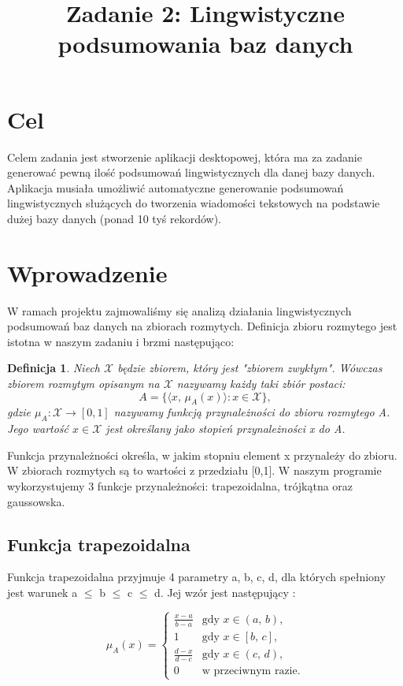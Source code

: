 \documentclass{classrep}
\author{
	\studentinfo{Radosław Grela}{216769} \and
	\studentinfo{Jakub Wąchała}{216914} 
}
\title{Zadanie 2: Lingwistyczne podsumowania baz danych}
\newtheorem{defin}{Definicja}
\begin{document}
	\maketitle
	
	\section{Cel} %
	Celem zadania jest stworzenie aplikacji desktopowej, która ma za zadanie generować pewną ilość podsumowań lingwistycznych dla danej bazy danych. Aplikacja musiała umożliwić automatyczne generowanie podsumowań lingwistycznych służących do tworzenia wiadomości tekstowych na podstawie dużej bazy danych (ponad 10 tyś rekordów). \cite{tresc}
	
	\section{Wprowadzenie} %
	W ramach projektu zajmowaliśmy się analizą działania lingwistycznych podsumowań baz danych na zbiorach rozmytych. Definicja zbioru rozmytego jest istotna w naszym zadaniu i brzmi następująco:
	\begin{defin}
		\label{rozmyty}
		Niech $\mathcal{X}$ będzie zbiorem, który jest "zbiorem zwykłym". Wówczas zbiorem rozmytym opisanym na $\mathcal{X}$ nazywamy każdy taki zbiór postaci:
		\begin{equation}
		A = \{\langle x,\, \mu_A(x)\rangle : x \in \mathcal{X} \}, 
		\end{equation}
		gdzie $\mu_A: \mathcal{X} \to [0,1]$ nazywamy funkcją przynależności do zbioru rozmytego A. Jego wartość $x \in \mathcal{X}$ jest określany jako stopień przynależności x do A.
	\end{defin}

	Funkcja przynależności określa, w jakim stopniu element x przynależy do zbioru. W zbiorach rozmytych są to wartości z przedziału [0,1]. W naszym programie wykorzystujemy 3 funkcje przynależności: trapezoidalna, trójkątna oraz gaussowska.


	
	\subsection{Funkcja trapezoidalna}
	Funkcja trapezoidalna przyjmuje 4 parametry a, b, c, d, dla których spełniony jest warunek a $\leq$ b $\leq$ c $\leq$ d. Jej wzór jest następujący \cite{anbook}: 
	
	\begin{equation}
	\mu_A(x) = \begin{cases}
	\frac{x-a}{b-a} & \mbox{gdy } x \in (a,\, b), \\
	1                 & \mbox{gdy } x \in [b,\, c], \\
	\frac{d-x}{d-c} & \mbox{gdy } x \in (c,\, d), \\
	0                 & \mbox{w przeciwnym razie}.
	\end{cases}
	\end{equation}
	
\end{document}
